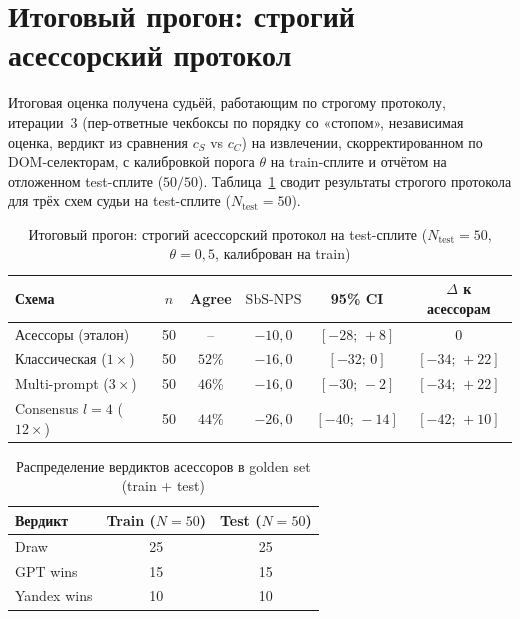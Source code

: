 \section{Итоговый прогон: строгий асессорский протокол}
\label{sec:results:final}

Итоговая оценка получена судьёй, работающим по строгому протоколу, итерации~3 (пер-ответные чекбоксы
по порядку со «стопом», независимая оценка, вердикт из сравнения $c_S$ vs
$c_C$) на извлечении, скорректированном по DOM-селекторам, с калибровкой порога $\theta$ на train-сплите
и отчётом на отложенном test-сплите ($50/50$).
Таблица~\ref{tab:results-final} сводит результаты строгого протокола для
трёх схем судьи на test-сплите ($N_{\text{test}} = 50$).

\begin{table}[htbp]
    \centering
    \caption{Итоговый прогон: строгий асессорский протокол на test-сплите
    ($N_{\text{test}} = 50$, $\theta = 0{,}5$, калиброван на train)}
    \label{tab:results-final}
    \begin{tabular}{lccccc}
        \toprule
        Схема & $n$ & Agree &
        \multicolumn{1}{c}{$\mathrm{SbS\text{-}NPS}$} &
        95\% CI & $\Delta$ к асессорам \\
        \midrule
        Асессоры (эталон) & 50 & -- &
            $-10{,}0$ & $[-28;\,{+}8]$ & $0$ \\
        Классическая ($1\times$) & 50 & $52\%$ &
            $-16{,}0$ & $[-32;\,0]$ & $[-34;\,{+}22]$ \\
        Multi-prompt ($3\times$) & 50 & $46\%$ &
            $-16{,}0$ & $[-30;\,{-}2]$ & $[-34;\,{+}22]$ \\
        Consensus $l{=}4$ ($12\times$) & 50 & $44\%$ &
            $-26{,}0$ & $[-40;\,{-}14]$ & $[-42;\,{+}10]$ \\
        \bottomrule
    \end{tabular}
\end{table}

\begin{table}[htbp]
\centering
\caption{Распределение вердиктов асессоров в golden set (train + test)}
\label{tab:verdict-distribution}
\begin{tabular}{lcc}
\toprule
Вердикт & Train ($N=50$) & Test ($N=50$) \\
\midrule
Draw & 25 & 25 \\ %
GPT wins & 15 & 15 \\ %
Yandex wins & 10 & 10 \\ %
\bottomrule
\end{tabular}
\end{table}

